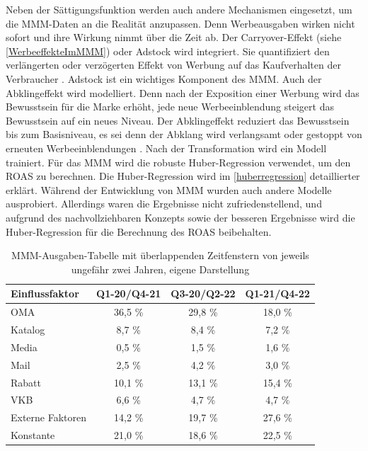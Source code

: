 Neben der Sättigungsfunktion werden auch andere Mechanismen eingesetzt, um die \ac{MMM}-Daten an die Realität anzupassen. Denn Werbeausgaben wirken nicht sofort und ihre Wirkung nimmt über die Zeit ab. Der Carryover-Effekt (siehe \autoref{WerbeeffekteImMMM}) oder Adstock wird integriert. Sie quantifiziert den verlängerten oder verzögerten Effekt von Werbung auf das Kaufverhalten der Verbraucher \cite{broadbent1979}. Adstock ist ein wichtiges Komponent des \ac{MMM}. Auch der Abklingeffekt wird modelliert. Denn nach der Exposition einer Werbung wird das Bewusstsein für die Marke erhöht, jede neue Werbeeinblendung steigert das Bewusstsein auf ein neues Niveau. Der Abklingeffekt reduziert das Bewusstsein bis zum Basisniveau, es sei denn der Abklang wird verlangsamt oder gestoppt von erneuten Werbeeinblendungen \cite{Joseph2006Adstock}. Nach der Transformation wird ein Modell trainiert. Für das \ac{MMM} wird die robuste Huber-Regression verwendet, um den \ac{ROAS} zu berechnen. Die Huber-Regression wird im \autoref{huberregression} detaillierter erklärt. Während der Entwicklung von \ac{MMM} wurden auch andere Modelle ausprobiert. Allerdings waren die Ergebnisse nicht zufriedenstellend, und aufgrund des nachvollziehbaren Konzepts sowie der besseren Ergebnisse wird die Huber-Regression für die Berechnung des \ac{ROAS} beibehalten.
\begin{table}[H]
\centering
\renewcommand{\arraystretch}{1.3}
\setlength{\tabcolsep}{10pt}
\begin{tabular}{|l|c|c|c|}
\hline
\textbf{Einflussfaktor} & \textbf{Q1-20/Q4-21} & \textbf{Q3-20/Q2-22} & \textbf{Q1-21/Q4-22} \\ \hline
OMA                    & 36,5 \%               & 29,8 \%               & 18,0 \%               \\ \hline
Katalog                & 8,7 \%                & 8,4 \%                & 7,2 \%                \\ \hline
Media                  & 0,5 \%                & 1,5 \%                & 1,6 \%                \\ \hline
Mail                   & 2,5 \%                & 4,2 \%                & 3,0 \%                \\ \hline
Rabatt                 & 10,1 \%               & 13,1 \%               & 15,4 \%               \\ \hline
VKB                    & 6,6 \%                & 4,7 \%                & 4,7 \%                \\ \hline
Externe Faktoren       & 14,2 \%               & 19,7 \%               & 27,6 \%               \\ \hline
Konstante              & 21,0 \%               & 18,6 \%               & 22,5 \%               \\ \hline
\end{tabular}
\caption{\ac{MMM}-Ausgaben-Tabelle mit überlappenden Zeitfenstern von jeweils ungefähr zwei Jahren, eigene Darstellung}
\label{tab:mmmausgaben}
\end{table}
